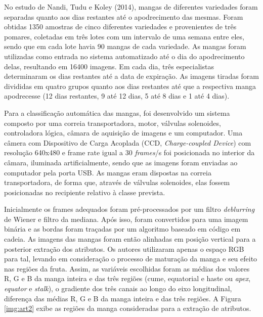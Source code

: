 No estudo de Nandi, Tudu e Koley (2014), mangas de diferentes variedades foram separadas quanto aos dias restantes até o apodrecimento das mesmas. Foram obtidas 1350 amostras de cinco diferentes variedades e provenientes de três pomares, coletadas em três lotes com um intervalo de uma semana entre eles, sendo que em cada lote havia 90 mangas de cada variedade. As mangas foram utilizadas como entrada no sistema automatizado até o dia do apodrecimento delas, resultando em 16400 imagens. Em cada dia, três especialistas determinaram os dias restantes até a data de expiração. As imagens tiradas foram divididas em quatro grupos quanto aos dias restantes até que a respectiva manga apodrecesse (12 dias restantes, 9 até 12 dias, 5 até 8 dias e 1 até 4 dias).

Para a classificação automática das mangas, foi desenvolvido um sistema composto por uma correia transportadora, motor, válvulas solenoides, controladora lógica, câmara de aquisição de imagens e um computador. Uma câmera com Dispositivo de Carga Acoplada (CCD, \textit{Charge-coupled Device}) com resolução 640x480 e frame rate igual a 30 \textit{frames}/s foi posicionada no interior da câmara, iluminada artificialmente, sendo que as imagens foram enviadas ao computador pela porta USB. As mangas eram dispostas na correia transportadora, de forma que, através de válvulas solenoides, elas fossem posicionadas no recipiente relativo à classe prevista. 

Inicialmente os frames adequados foram pré-processados por um filtro \textit{deblurring} de Wiener e filtro da mediana. Após isso, foram convertidos para uma imagem binária e as bordas foram traçadas por um algoritmo baseado em código em cadeia. As imagens das mangas foram então alinhadas em posição vertical para a posterior extração dos atributos. Os autores utilizaram apenas o espaço RGB para tal, levando em consideração o processo de maturação da manga e seu efeito nas regiões da fruta. Assim, as variáveis escolhidas foram as médias dos valores R, G e B da manga inteira e das três regiões (cume, equatorial e haste ou \textit{apex}, \textit{equator} e \textit{stalk}), o gradiente dos três canais ao longo do eixo longitudinal, diferença das médias R, G e B da manga inteira e das três regiões. A Figura \ref{img:art2} exibe as regiões da manga consideradas para a extração de atributos.


